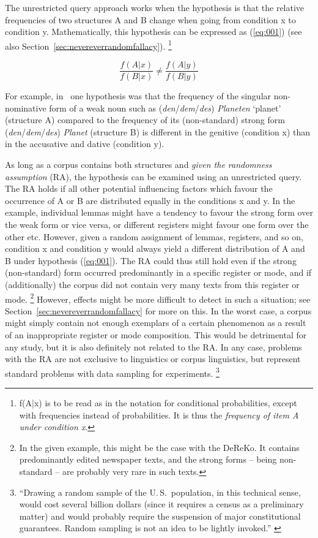 The unrestricted query approach works when the hypothesis is that the relative frequencies of two structures A and B change when going from condition x to condition y.
Mathematically, this hypothesis can be expressed as (\ref{eq:001}) (see also Section~\ref{sec:nevereverrandomfallacy}).%
\footnote{f(A|x) is to be read as in the notation for conditional probabilities, except with frequencies instead of probabilities.
  It is thus the \textit{frequency of item A under condition x}.}

\begin{equation}
  \frac{f(A|x)}{f(B|x)}\not =\frac{f(A|y)}{f(B|y)}
  \label{eq:001}
\end{equation}

For example, in \ROWeakN\ one hypothesis was that the frequency of the singular non-nominative form of a weak noun such as (\textit{den}\slash\textit{dem}\slash\textit{des}) \textit{Planeten} `planet' (structure A) compared to the frequency of its (non-standard) strong form (\textit{den}\slash\textit{dem}\slash\textit{des}) \textit{Planet} (structure B) is different in the genitive (condition x) than in the accusative and dative (condition y).

As long as a corpus contains both structures and \textit{given the randomness assumption} (RA), the hypothesis can be examined using an unrestricted query.
The RA holds if all other potential influencing factors which favour the occurrence of A or B are distributed equally in the conditions x and y.
In the example, individual lemmas might have a tendency to favour the strong form over the weak form or vice versa, or different registers might favour one form over the other etc.
However, given a random assignment of lemmas, registers, and so on, condition x and condition y would always yield a different distribution of A and B under hypothesis (\ref{eq:001}).
The RA could thus still hold even if the strong (non-standard) form occurred predominantly in a specific register or mode, and if (additionally) the corpus did not contain very many texts from this register or mode.%
\footnote{In the given example, this might be the case with the DeReKo.
It contains predominantly edited newspaper texts, and the strong forms -- being non-standard -- are probably very rare in such texts.}
However, effects might be more difficult to detect in such a situation; see Section~\ref{sec:nevereverrandomfallacy} for more on this.
In the worst case, a corpus might simply contain not enough exemplars of a certain phenomenon as a result of an inappropriate register or mode composition.
This would be detrimental for any study, but it is also definitely not related to the RA.
In any case, problems with the RA are not exclusive to linguistics or corpus linguistics, but represent standard problems with data sampling for experiments.%
\footnote{``Drawing a random sample of the U.\,S.\ population, in this technical sense, would cost several billion dollars (since it requires a census as a preliminary matter) and would probably require the suspension of major constitutional guarantees. Random sampling is not an idea to be lightly invoked.'' \citep[23]{BerkFreedman2009}}

